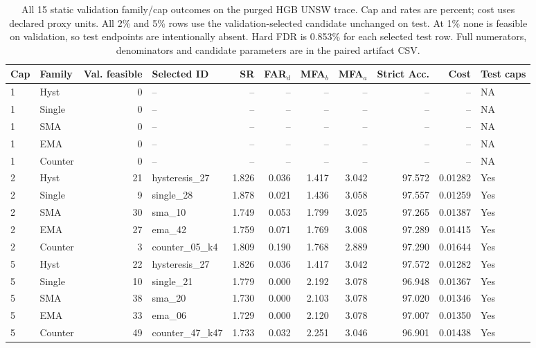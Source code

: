 \begin{table}[!htbp]
\centering
\caption{All 15 static validation family/cap outcomes on the purged HGB UNSW trace. Cap and rates are percent; cost uses declared proxy units. All 2\% and 5\% rows use the validation-selected candidate unchanged on test. At 1\% none is feasible on validation, so test endpoints are intentionally absent. Hard FDR is 0.853\% for each selected test row. Full numerators, denominators and candidate parameters are in the paired artifact CSV.}
\label{tab:supp_static_all}
\scriptsize
\setlength{\tabcolsep}{3pt}
\begin{tabular}{llrlrrrrrrl}
\toprule
Cap & Family & Val. feasible & Selected ID & SR & FAR$_d$ & MFA$_b$ & MFA$_a$ & Strict Acc. & Cost & Test caps\\
\midrule
1 & Hyst & 0 & -- & -- & -- & -- & -- & -- & -- & NA \\
1 & Single & 0 & -- & -- & -- & -- & -- & -- & -- & NA \\
1 & SMA & 0 & -- & -- & -- & -- & -- & -- & -- & NA \\
1 & EMA & 0 & -- & -- & -- & -- & -- & -- & -- & NA \\
1 & Counter & 0 & -- & -- & -- & -- & -- & -- & -- & NA \\
2 & Hyst & 21 & hysteresis\_27 & 1.826 & 0.036 & 1.417 & 3.042 & 97.572 & 0.01282 & Yes \\
2 & Single & 9 & single\_28 & 1.878 & 0.021 & 1.436 & 3.058 & 97.557 & 0.01259 & Yes \\
2 & SMA & 30 & sma\_10 & 1.749 & 0.053 & 1.799 & 3.025 & 97.265 & 0.01387 & Yes \\
2 & EMA & 27 & ema\_42 & 1.759 & 0.071 & 1.769 & 3.008 & 97.289 & 0.01415 & Yes \\
2 & Counter & 3 & counter\_05\_k4 & 1.809 & 0.190 & 1.768 & 2.889 & 97.290 & 0.01644 & Yes \\
5 & Hyst & 22 & hysteresis\_27 & 1.826 & 0.036 & 1.417 & 3.042 & 97.572 & 0.01282 & Yes \\
5 & Single & 10 & single\_21 & 1.779 & 0.000 & 2.192 & 3.078 & 96.948 & 0.01367 & Yes \\
5 & SMA & 38 & sma\_20 & 1.730 & 0.000 & 2.103 & 3.078 & 97.020 & 0.01346 & Yes \\
5 & EMA & 33 & ema\_06 & 1.729 & 0.000 & 2.120 & 3.078 & 97.007 & 0.01350 & Yes \\
5 & Counter & 49 & counter\_47\_k47 & 1.733 & 0.032 & 2.251 & 3.046 & 96.901 & 0.01438 & Yes \\
\bottomrule
\end{tabular}
\end{table}

